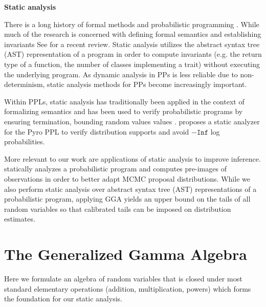 \documentclass[../thesis.tex]{subfiles}
\begin{document}
\textbf{Static analysis}

There is a long history of formal methods and probabilistic programming
\cite{kozen1979semantics,jones1989probabilistic}. While much of the research
\cite{claret2013bayesian}
is concerned with defining formal semantics
and establishing invariants \cite{wang2018pmaf}
See \cite{bernstein2019static} for a recent review.
Static analysis utilizes the abstract syntax tree (AST)
representation of a program in order to compute invariants
(e.g. the return type of a function, the number of classes implementing a trait)
without executing the underlying program.
As dynamic analysis in PPs is less reliable due to non-determinism, static analysis
methods for PPs become increasingly important.

Within PPLs, static analysis has traditionally been applied in the context of formalizing
semantics \citep{kozen1979semantics} and has been used to verify probabilistic
programs by ensuring termination, bounding random values values
\citep{sankaranarayanan2013static}. \cite{lee2019towards} proposes a static analyzer for the
Pyro PPL \citep{bingham2019pyro} to verify
distribution supports and avoid $-\texttt{Inf}$ log probabilities.


More relevant to our work are applications of static analysis to improve inference. \citet{nori2014r2} statically analyzes a probabilistic program and computes pre-images of observations in order to better adapt MCMC proposal distributions.
While we also perform static analysis over
abstract syntax tree (AST) representations of a probabilistic program,
applying GGA yields an upper bound on the tails of all random variables
so that calibrated tails can be imposed on distribution estimates.

\section{The Generalized Gamma Algebra}\label{sec:gga}

Here we formulate an algebra of random variables that is closed under most standard elementary operations (addition, multiplication, powers) which forms the foundation for our static analysis.
\end{document}
